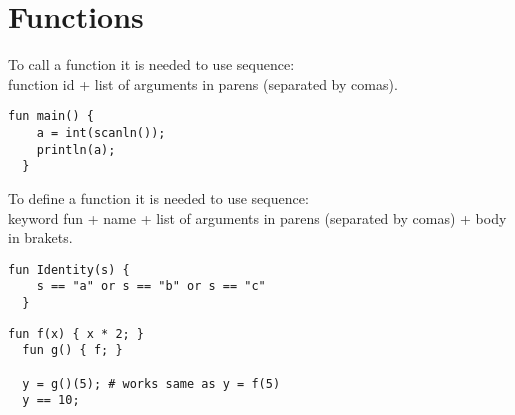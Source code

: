 \chapter{Functions}

To call a function it is needed to use sequence: \\
function id + list of arguments in parens (separated by comas).

\begin{example}
\begin{lstlisting}[language=intentio]
  fun main() {
    a = int(scanln());
    println(a);
  }
\end{lstlisting}
\end{example}

To define a function it is needed to use sequence: \\
keyword fun + name + list of arguments in parens (separated by comas) + body in brakets.

\begin{example}
\begin{lstlisting}[language=intentio]
  fun Identity(s) {
    s == "a" or s == "b" or s == "c"
  }
\end{lstlisting}
\end{example}

\begin{example}
\begin{lstlisting}[language=intentio,mathescape=true]
  fun f(x) { x * 2; }
  fun g() { f; }

  y = g()(5); # works same as y = f(5)
  y == 10;
\end{lstlisting}
\end{example}
